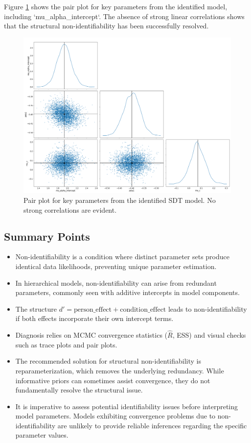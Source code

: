 \documentclass[12pt]{article}
\begin{document}
Figure \ref{fig:id_pair} shows the pair plot for key parameters from the identified model, including `mu\_alpha\_intercept`. The absence of strong linear correlations shows that the structural non-identifiability has been successfully resolved.

\begin{figure}[tbhp]
    \centering
    \includegraphics[width=\linewidth]{id_sdt_pair.png}
    \caption{Pair plot for key parameters from the identified SDT model. No strong correlations are evident.}
    \label{fig:id_pair}
\end{figure}


\subsection*{Summary Points}

\begin{itemize}[label=--, itemsep=1ex]
    \item Non-identifiability is a condition where distinct parameter sets produce identical data likelihoods, preventing unique parameter estimation.
    \item In hierarchical models, non-identifiability can arise from redundant parameters, commonly seen with additive intercepts in model components.
    \item The structure $d' = \text{person\_effect} + \text{condition\_effect}$ leads to non-identifiability if both effects incorporate their own intercept terms.
    \item Diagnosis relies on MCMC convergence statistics ($\hat{R}$, ESS) and visual checks such as trace plots and pair plots.
    \item The recommended solution for structural non-identifiability is reparameterization, which removes the underlying redundancy. While informative priors can sometimes assist convergence, they do not fundamentally resolve the structural issue.
    \item It is imperative to assess potential identifiability issues before interpreting model parameters. Models exhibiting convergence problems due to non-identifiability are unlikely to provide reliable inferences regarding the specific parameter values.
\end{itemize}
\end{document}
